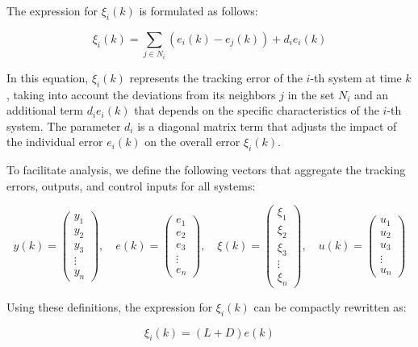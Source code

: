 \documentclass[journal,onecolumn]{IEEEtran}
\begin{document}
The expression for \(\xi_i(k)\) is formulated as follows:

\begin{equation}
    \label{model 32}
    \xi_i(k) = \sum_{j \in N_i} (e_i(k) - e_j(k)) + d_i e_i(k)
\end{equation}

In this equation, \(\xi_i(k)\) represents the tracking error of the \(i\)-th system at time \(k\), taking into account the deviations from its neighbors \(j\) in the set \(N_i\) and an additional term \(d_i e_i(k)\) that depends on the specific characteristics of the \(i\)-th system. The parameter \(d_i\) is a diagonal matrix term that adjusts the impact of the individual error \(e_i(k)\) on the overall error \(\xi_i(k)\).

To facilitate analysis, we define the following vectors that aggregate the tracking errors, outputs, and control inputs for all systems:

\[
y(k) = \begin{pmatrix} y_1 \\ y_2 \\ y_3 \\ \vdots \\ y_n \end{pmatrix}, \quad 
e(k) = \begin{pmatrix} e_1 \\ e_2 \\ e_3 \\ \vdots \\ e_n \end{pmatrix}, \quad 
\xi(k) = \begin{pmatrix} \xi_1 \\ \xi_2 \\ \xi_3 \\ \vdots \\ \xi_n \end{pmatrix}, \quad 
u(k) = \begin{pmatrix} u_1 \\ u_2 \\ u_3 \\ \vdots \\ u_n \end{pmatrix}
\]

Using these definitions, the expression for \(\xi_i(k)\) can be compactly rewritten as:

\begin{equation}
    \label{model 33}
    \xi_i(k) = (L + D) e(k)
\end{equation}
\end{document}
